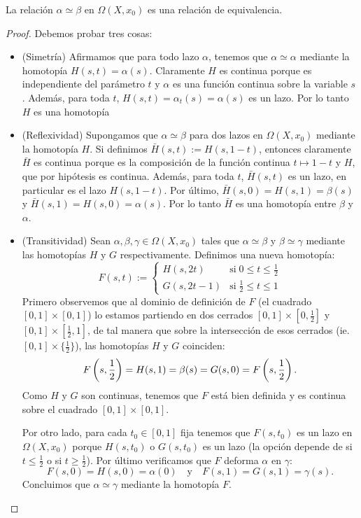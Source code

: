 
\begin{ejercicio}
La relaci\'on $\alpha\simeq\beta$ en $\Omega(X,x_0)$ es una relaci\'on de equivalencia.
\end{ejercicio}
\begin{proof}%

Debemos probar tres cosas:
\begin{itemize}
	\item(Simetr\'ia) Afirmamos que para todo lazo $\alpha$, tenemos que $\alpha\simeq\alpha$
	mediante la homotop\'ia $H(s,t)=\alpha(s)$. Claramente $H$ es continua porque es independiente
	del par\'ametro $t$ y $\alpha$ es una funci\'on continua sobre la variable $s$. Adem\'as, para
	toda $t$, $H(s,t)=\alpha_t(s)=\alpha(s)$ es un lazo. Por lo tanto $H$ es una homotop\'ia
	
	\item(Reflexividad) Supongamos que $\alpha\simeq\beta$ para dos lazos en $\Omega(X,x_0)$
	mediante la homotop\'ia $H$. Si definimos $\bar{H}(s,t):=H(s,1-t)$, entonces claramente
	$\bar{H}$ es continua porque es la composici\'on de la funci\'on continua $t\mapsto 1-t$
	y $H$, que por hip\'otesis es continua. Adem\'as, para toda $t$, $\bar{H}(s,t)$ es un lazo,
	en particular es el lazo $H(s,1-t)$. Por \'ultimo, $\bar{H}(s,0)=H(s,1)=\beta(s)$ y
	$\bar{H}(s,1)=H(s,0)=\alpha(s)$. Por lo tanto $\bar{H}$ es una homotop\'ia entre $\beta$ y
	$\alpha$.
	
	\item(Transitividad) Sean $\alpha,\beta,\gamma\in\Omega(X,x_0)$ tales que $\alpha\simeq\beta$
	y $\beta\simeq\gamma$ mediante las homotop\'ias $H$ y $G$ respectivamente. Definimos una nueva
	homotop\'ia:
	\[
		F(s,t):=
		\begin{cases}
			H(s,2t) & \text{si}\; 0\leq t\leq \frac{1}{2} \\
			G(s,2t-1) & \text{si}\; \frac{1}{2} \leq t \leq 1
		\end{cases}
	\]
	Primero observemos que al dominio de definici\'on de $F$ (el cuadrado $[0,1]\times[0,1]$) lo
	estamos partiendo en dos cerrados $[0,1]\times[0,\tfrac{1}{2}]$ y $[0,1]\times[\tfrac{1}{2},1]$,
	de tal manera que sobre la intersecci\'on de esos cerrados (ie. $[0,1]\times\{\frac{1}{2}\}$),
	las homotop\'ias $H$ y $G$ coinciden:
	\[
		F\left( s,\frac{1}{2} \right)=H(s,1)=\beta(s)=G(s,0)=F\left( s,\frac{1}{2} \right).
	\]
	Como $H$ y $G$ son continuas, tenemos que $F$ est\'a bien definida y es continua sobre el cuadrado
	$[0,1]\times[0,1]$.
	
	Por otro lado, para cada $t_0\in[0,1]$ fija tenemos que $F(s,t_0)$ es un lazo en $\Omega(X,x_0)$
	porque $H(s,t_0)$ o $G(s,t_0)$ es un lazo (la opci\'on depende de si $t\leq\tfrac{1}{2}$ o si
	$t\geq\tfrac{1}{2}$). Por \'ultimo verificamos que $F$ deforma $\alpha$ en $\gamma$:
	\[
		F(s,0)=H(s,0)=\alpha(0) \quad\text{y}\quad F(s,1)=G(s,1)=\gamma(s).
	\]
	Concluimos que $\alpha\simeq\gamma$ mediante la homotop\'ia $F$.
\end{itemize}

\end{proof}%

